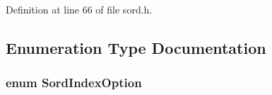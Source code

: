 Definition at line 66 of file sord.\+h.



\subsection{Enumeration Type Documentation}
\subsubsection[{\texorpdfstring{Sord\+Index\+Option}{SordIndexOption}}]{\setlength{\rightskip}{0pt plus 5cm}enum {\bf Sord\+Index\+Option}}\hypertarget{group__sord_gaf490691787913fb85293d05eab00a735}{}\label{group__sord_gaf490691787913fb85293d05eab00a735}
